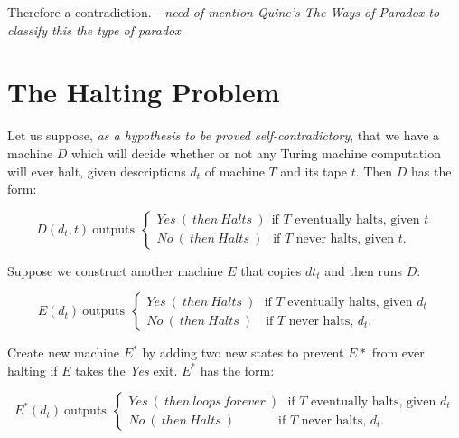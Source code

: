 \documentclass{article}[12pt]
\begin{document}
\noindent

Therefore a contradiction. \emph{ - need of mention Quine's The Ways of Paradox to classify this the type of paradox }

\section{The Halting Problem\cite{Minsky1}}

\noindent

Let us suppose, \emph{as a hypothesis to be proved self-contradictory}, that we have a machine $D$ which will decide whether or not any Turing machine computation will ever halt, given descriptions $d_t$ of machine $T$ and its tape $t$. Then $D$ has the form: 

\begin{equation*}                                       %
   D(d_t, t ) \ \text{outputs} \ \ \begin{cases}
    Yes \ ( \ then \ Halts \ ) \ \  \text{if $T$ eventually halts, given $t$} \\
    No \  ( \ then \ Halts \ ) \ \  \text{ if $T$ never halts, given $t$}.
  \end{cases}
\end{equation*}

\noindent 

Suppose we construct another machine $E$ that copies $dt_t$ and then runs $D$:

\begin{equation*}                                       %
   E(d_t) \ \text{outputs} \ \ \begin{cases}
    Yes \ ( \ then \ Halts \ )\ \ \  \text{if $T$ eventually halts, given $d_t$} \\
     No \ ( \ then \ Halts \ ) \ \ \  \text{ if $T$ never halts, $d_t$}.
  \end{cases}
\end{equation*}

\noindent 

Create new machine $E^*$ by adding two new states to prevent $E*$ from ever halting if $E$ takes the \emph{Yes} exit. $E^*$ has the form:
\noindent 

\begin{equation*}                                       %
   E^*(d_t) \ \text{outputs} \ \ \begin{cases}
    Yes \ ( \ then \ loops \ forever \ ) \ \ \  \text{if $T$ eventually halts, given $d_t$} \\
     No  \ (  \ then \ Halts  \ )  \ \ \ \ \ \ \ \ \  \  \  \ \ \  \text{ if $T$ never halts, $d_t$}.
  \end{cases}
\end{equation*}
\end{document}
